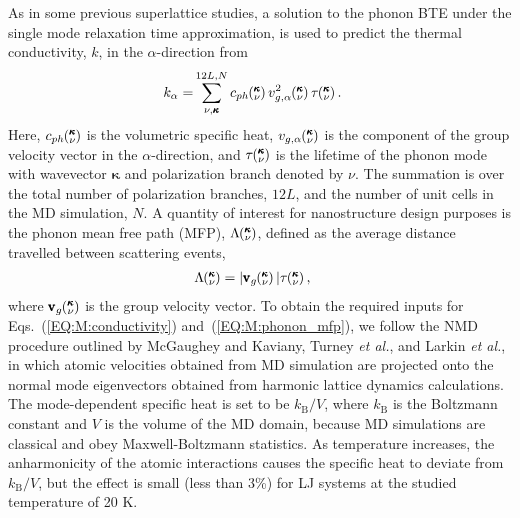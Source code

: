 \documentclass[aps,prb,preprint,preprintnumbers,amsmath,amssymb,floatfix,superscriptaddress]{revtex4}
\newcommand{\kv}{\mspace{-4.0mu}\left(\mspace{-8.0mu}
\begin{smallmatrix}&\pmb{\kappa} \\&\nu\end{smallmatrix}
\mspace{-3.0mu}\right)}
\begin{document}
As in some previous superlattice studies, \cite{Luckyanova16112012,doi:10.1021/nl202186y,savic:073113,PhysRevB.87.140302} a solution to the phonon BTE under the single mode relaxation time approximation,\cite{ziman_electrons_2001} is used to predict the thermal conductivity, $k$, in the $\alpha$-direction from
\begin{equation}\label{EQ:M:conductivity}
\begin{split}
k_{\mathbf{\alpha}}=&\sum_{\nu,\pmb{\kappa}}^{12L,N} c_{ph}\kv
v^{2}_{g,\mathbf{\alpha}}\kv \tau\kv.
\end{split}
\end{equation}
Here, $c_{ph}\kv$ is the volumetric specific heat, $v_{g,\mathbf{\alpha}}\kv$ is the component of the group velocity vector in the $\alpha$-direction, and $\tau\kv$ is the lifetime of the phonon mode with wavevector $\pmb{\kappa}$ and polarization branch denoted by $\nu$. The summation is over the total number of polarization branches, $12L$, and the number of unit cells in the MD simulation, $N$. A quantity of interest for nanostructure design purposes \cite{PhysRevB.87.035437} is the phonon mean free path (MFP), $\Lambda\kv$, defined as the average distance travelled between scattering events, \cite{ziman_electrons_2001}
\begin{equation}\label{EQ:M:phonon_mfp}
\begin{split}
\Lambda\kv &= |\pmb{\mathrm{v}}_{g}\kv | \tau\kv,
\end{split}
\end{equation}
where $\pmb{\mathrm{v}}_{g}\kv$ is the group velocity vector. To obtain the required inputs for Eqs.~(\ref{EQ:M:conductivity}) and~(\ref{EQ:M:phonon_mfp}), we follow the NMD procedure outlined by McGaughey and Kaviany,\cite{PhysRevB.69.094303} Turney \textit{et al.},\cite {PhysRevB.79.064301} and Larkin \textit{et al.},\cite{jason_inpress} in which atomic velocities obtained from MD simulation are projected onto the normal mode eigenvectors obtained from harmonic lattice dynamics calculations. The mode-dependent specific heat is set to be $k_\mathrm{B}/V$, where  $k_\mathrm{B}$ is the Boltzmann constant and $V$ is the volume of the MD domain, because MD simulations are classical and obey Maxwell-Boltzmann statistics. As temperature increases, the anharmonicity of the atomic interactions causes the specific heat to deviate from $k_\mathrm{B}/V$, but the effect is small (less than 3\%) for LJ systems at the studied temperature of 20 K.\cite{PhysRevB.69.094303} 
\end{document}
